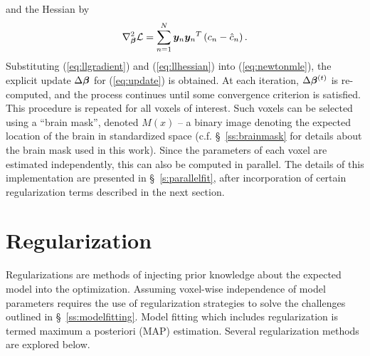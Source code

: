 and the Hessian by
\begin{equation}
\nabla^2_{\bm{\beta}}\mathcal{L} = \sum_{n=1}^{N} \bm{y}_n{\bm{y}_n}^T \left(c_n - \hat{c}_n\right).
\label{eq:llhessian}
\end{equation}
Substituting (\ref{eq:llgradient}) and (\ref{eq:llhessian}) into (\ref{eq:newtonmle}), the explicit update $\Delta\bm{\beta}$ for (\ref{eq:update}) is obtained. At each iteration, $\Delta\bm{\beta}^{(t)}$ is re-computed, and the process continues until some convergence criterion is satisfied. This procedure is repeated for all voxels of interest. Such voxels can be selected using a ``brain mask'', denoted $M(x)$ -- a binary image denoting the expected location of the brain in standardized space (c.f. \S\ \ref{ss:brainmask} for details about the brain mask used in this work). Since the parameters of each voxel are estimated independently, this can also be computed in parallel. The details of this implementation are presented in \S\ \ref{s:parallelfit}, after incorporation of certain regularization terms described in the next section.
\section{Regularization}\label{s:reg-method}
Regularizations are methods of injecting prior knowledge about the expected model into the optimization. Assuming voxel-wise independence of model parameters requires the use of regularization strategies to solve the challenges outlined in \S\ \ref{ss:modelfitting}. Model fitting which includes regularization is termed maximum a posteriori (MAP) estimation. Several regularization methods are explored below.
